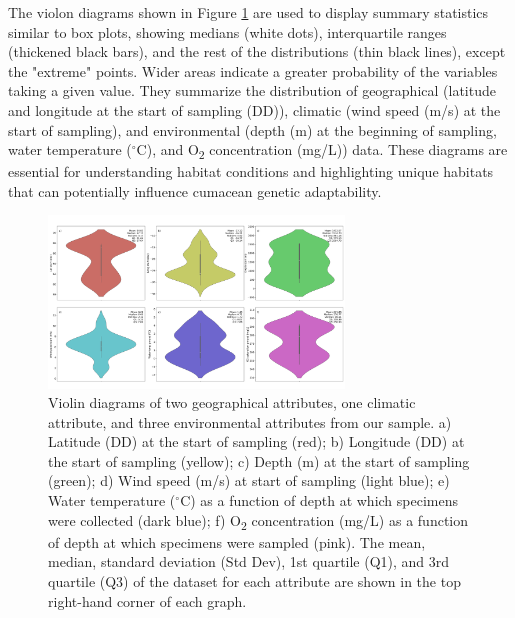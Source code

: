 The violon diagrams shown in Figure \ref{fig:fig2} are used to display summary statistics similar to box plots, showing medians (white dots), interquartile ranges (thickened black bars), and the rest of the distributions (thin black lines), except the "extreme" points. Wider areas indicate a greater probability of the variables taking a given value. They summarize the distribution of geographical (latitude and longitude at the start of sampling (DD)), climatic (wind speed (m/s) at the start of sampling), and environmental (depth (m) at the beginning of sampling, water temperature ($^\circ$C), and O\textsubscript{2} concentration (mg/L)) data. These diagrams are essential for understanding habitat conditions and highlighting unique habitats that can potentially influence cumacean genetic adaptability. 

\begin{figure}[htbp]
    \centering
    \includegraphics[width=0.7\textwidth]{figure1.jpg}
    \caption{Violin diagrams of two geographical attributes, one climatic attribute, and three environmental attributes from our sample. a) Latitude (DD) at the start of sampling (red); b) Longitude (DD) at the start of sampling (yellow); c) Depth (m) at the start of sampling (green); d) Wind speed (m/s) at start of sampling (light blue); e) Water temperature ($^\circ$C) as a function of depth at which specimens were collected (dark blue); f) O\textsubscript{2} concentration (mg/L) as a function of depth at which specimens were sampled (pink). The mean, median, standard deviation (Std Dev), 1st quartile (Q1), and 3rd quartile (Q3) of the dataset for each attribute are shown in the top right-hand corner of each graph. \label{fig:fig2}}
\end{figure}

